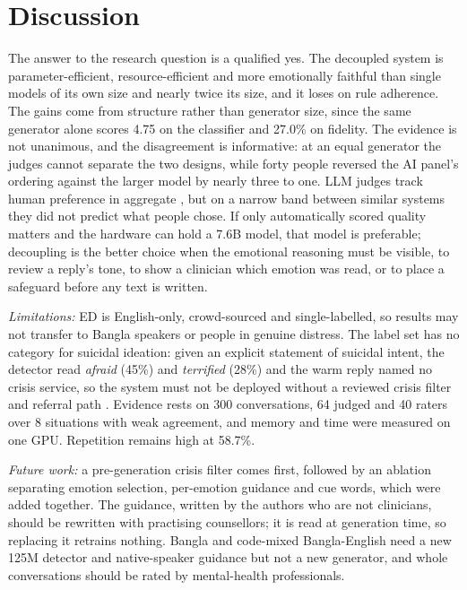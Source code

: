 \documentclass[conference]{IEEEtran}
\begin{document}
\section{Discussion}\label{sec:discussion}
The answer to the research question is a qualified yes. The decoupled system is parameter-efficient, resource-efficient and more emotionally faithful than single models of its own size and nearly twice its size, and it loses on rule adherence. The gains come from structure rather than generator size, since the same generator alone scores 4.75 on the classifier and 27.0\% on fidelity. The evidence is not unanimous, and the disagreement is informative: at an equal generator the judges cannot separate the two designs, while forty people reversed the AI panel's ordering against the larger model by nearly three to one. LLM judges track human preference in aggregate \cite{b32}, but on a narrow band between similar systems they did not predict what people chose. If only automatically scored quality matters and the hardware can hold a 7.6B model, that model is preferable; decoupling is the better choice when the emotional reasoning must be visible, to review a reply's tone, to show a clinician which emotion was read, or to place a safeguard before any text is written.

\textit{Limitations:} ED is English-only, crowd-sourced and single-labelled, so results may not transfer to Bangla speakers or people in genuine distress. The label set has no category for suicidal ideation: given an explicit statement of suicidal intent, the detector read \textit{afraid} (45\%) and \textit{terrified} (28\%) and the warm reply named no crisis service, so the system must not be deployed without a reviewed crisis filter and referral path \cite{b58}. Evidence rests on 300 conversations, 64 judged and 40 raters over 8 situations with weak agreement, and memory and time were measured on one GPU. Repetition remains high at 58.7\%.

\textit{Future work:} a pre-generation crisis filter comes first, followed by an ablation separating emotion selection, per-emotion guidance and cue words, which were added together. The guidance, written by the authors who are not clinicians, should be rewritten with practising counsellors; it is read at generation time, so replacing it retrains nothing. Bangla and code-mixed Bangla-English need a new 125M detector and native-speaker guidance but not a new generator, and whole conversations should be rated by mental-health professionals.
\end{document}
